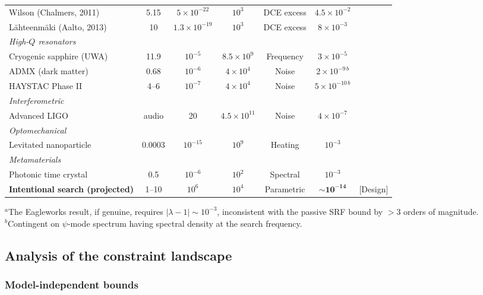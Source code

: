 \documentclass[12pt,aps,prd,twocolumn,superscriptaddress,nofootinbib]{revtex4-2}
\begin{document}
\begin{table}
\begin{ruledtabular}
\begin{tabular}{lcccccc}
Wilson (Chalmers, 2011) & 5.15 & $5\times10^{-22}$ & $10^3$ &
DCE excess & $4.5\times10^{-2}$ & \cite{Wilson2011} \\
L\"ahteenm\"aki (Aalto, 2013) & 10 & $1.3\times10^{-19}$ & $10^3$ &
DCE excess & $8\times10^{-3}$ & \cite{Lahteenmaki2013} \\
\hline
\multicolumn{7}{l}{\textit{High-$Q$ resonators}} \\
Cryogenic sapphire (UWA) & 11.9 & $10^{-5}$ & $8.5\times10^9$ &
Frequency & $3\times10^{-5}$ & \cite{Hartnett2006} \\
ADMX (dark matter) & 0.68 & $10^{-6}$ & $4\times10^4$ &
Noise & $2\times10^{-9\,b}$ & \cite{Du2018} \\
HAYSTAC Phase II & 4--6 & $10^{-7}$ & $4\times10^4$ &
Noise & $5\times10^{-10\,b}$ & \cite{Backes2021} \\
\hline
\multicolumn{7}{l}{\textit{Interferometric}} \\
Advanced LIGO & audio & 20 & $4.5\times10^{11}$ &
Noise & $4\times10^{-7}$ & \cite{aLIGO2015} \\
\hline
\multicolumn{7}{l}{\textit{Optomechanical}} \\
Levitated nanoparticle & 0.0003 & $10^{-15}$ & $10^9$ &
Heating & $10^{-3}$ & \cite{Delic2020} \\
\hline
\multicolumn{7}{l}{\textit{Metamaterials}} \\
Photonic time crystal & 0.5 & $10^{-6}$ & $10^2$ &
Spectral & $10^{-3}$ & \cite{Lustig2023} \\
\hline\hline
\textbf{Intentional search (projected)} & 1--10 & $10^6$ & $10^4$ &
Parametric & $\mathbf{\sim10^{-14}}$ & [Design] \\
\end{tabular}
\end{ruledtabular}
\begin{flushleft}
$^a$The Eagleworks result, if genuine, requires $|\lambda-1| \sim 10^{-3}$,
inconsistent with the passive SRF bound by $>3$ orders of magnitude.\\
$^b$Contingent on $\psi$-mode spectrum having spectral density at the
search frequency.
\end{flushleft}
\end{table}

\subsection{Analysis of the constraint landscape}

\subsubsection{Model-independent bounds}
\end{document}
